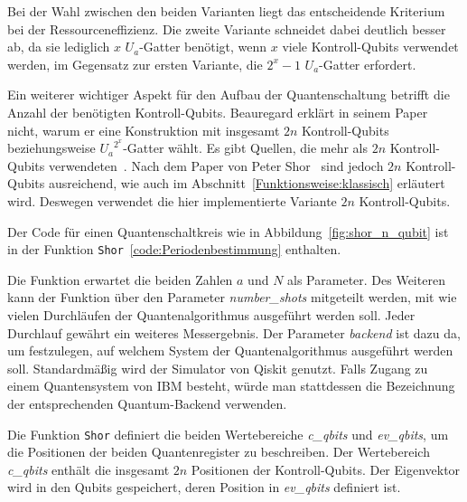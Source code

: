 Bei der Wahl zwischen den beiden Varianten liegt das entscheidende Kriterium bei der Ressourceneffizienz. 
Die zweite Variante schneidet dabei deutlich besser ab, 
da sie lediglich \(x\) \(U_a\)-Gatter benötigt, 
wenn \(x\) viele Kontroll-Qubits verwendet werden, 
im Gegensatz zur ersten Variante, die \(2^x-1\) \(U_a\)-Gatter erfordert.

Ein weiterer wichtiger Aspekt für den Aufbau der Quantenschaltung betrifft die Anzahl der benötigten Kontroll-Qubits.
Beauregard erklärt in seinem Paper~\cite{beauregard2003circuit} nicht, 
warum er eine Konstruktion mit insgesamt \(2n\) Kontroll-Qubits beziehungsweise \({U_a}^{2^x}\)-Gatter wählt.
Es gibt Quellen, die mehr als \(2n\)  Kontroll-Qubits verwendeten~\cite[229]{nielsen_chuang_2010}.
Nach dem Paper von Peter Shor~\cite{Shor_1997} sind jedoch \(2n\) Kontroll-Qubits ausreichend,
wie auch im Abschnitt~\ref{Funktionsweise:klassisch} erläutert wird.
Deswegen verwendet die hier implementierte Variante \(2n\) Kontroll-Qubits.

\vspace{1em}

Der Code für einen Quantenschaltkreis wie in Abbildung~\ref{fig:shor_n_qubit} ist in der Funktion 
\texttt{Shor}~\ref{code:Periodenbestimmung} enthalten.

Die Funktion erwartet die beiden Zahlen \(a\) und \(N\) als Parameter.
Des Weiteren kann der Funktion über den Parameter \textit{number\_shots} mitgeteilt werden, 
mit wie vielen Durchläufen der Quantenalgorithmus ausgeführt werden soll.
Jeder Durchlauf gewährt ein weiteres Messergebnis.
Der Parameter \textit{backend} ist dazu da, 
um festzulegen, auf welchem System der Quantenalgorithmus ausgeführt werden soll.
Standardmäßig wird der Simulator von Qiskit genutzt. 
Falls Zugang zu einem Quantensystem von IBM besteht, 
würde man stattdessen die Bezeichnung der entsprechenden Quantum-Backend verwenden.

Die Funktion \texttt{Shor} definiert die beiden Wertebereiche \textit{c\_qbits} und 
\textit{ev\_qbits}, um die Positionen der beiden Quantenregister zu beschreiben.
Der Wertebereich \textit{c\_qbits} enthält die insgesamt \(2n\) Positionen der Kontroll-Qubits.
Der Eigenvektor wird in den Qubits gespeichert, 
deren Position in \textit{ev\_qbits} definiert ist.


